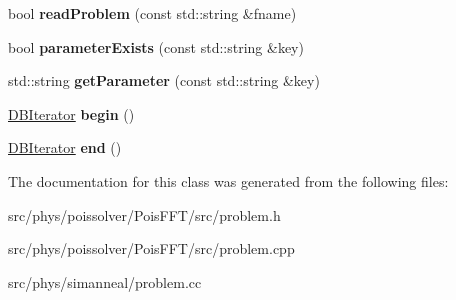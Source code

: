 \begin{DoxyCompactItemize}
\item 
bool {\bfseries read\+Problem} (const std\+::string \&fname)\hypertarget{classphys_1_1Problem_a6d28665905bd9ef00e19a88a74526f62}{}\label{classphys_1_1Problem_a6d28665905bd9ef00e19a88a74526f62}

\item 
bool {\bfseries parameter\+Exists} (const std\+::string \&key)\hypertarget{classphys_1_1Problem_a055222faa9d3e4e2762f8b8e7e84686e}{}\label{classphys_1_1Problem_a055222faa9d3e4e2762f8b8e7e84686e}

\item 
std\+::string {\bfseries get\+Parameter} (const std\+::string \&key)\hypertarget{classphys_1_1Problem_a2c0c4e5f6955c58bd55c9fee3b257d79}{}\label{classphys_1_1Problem_a2c0c4e5f6955c58bd55c9fee3b257d79}

\item 
\hyperlink{classphys_1_1Problem_1_1DBIterator}{D\+B\+Iterator} {\bfseries begin} ()\hypertarget{classphys_1_1Problem_a93867d95d5d355b0e1caa929ca953f07}{}\label{classphys_1_1Problem_a93867d95d5d355b0e1caa929ca953f07}

\item 
\hyperlink{classphys_1_1Problem_1_1DBIterator}{D\+B\+Iterator} {\bfseries end} ()\hypertarget{classphys_1_1Problem_aa3b2e95182d4aa8b8666a4bd78d717a5}{}\label{classphys_1_1Problem_aa3b2e95182d4aa8b8666a4bd78d717a5}

\end{DoxyCompactItemize}


The documentation for this class was generated from the following files\+:\begin{DoxyCompactItemize}
\item 
src/phys/poissolver/\+Pois\+F\+F\+T/src/problem.\+h\item 
src/phys/poissolver/\+Pois\+F\+F\+T/src/problem.\+cpp\item 
src/phys/simanneal/problem.\+cc\end{DoxyCompactItemize}
